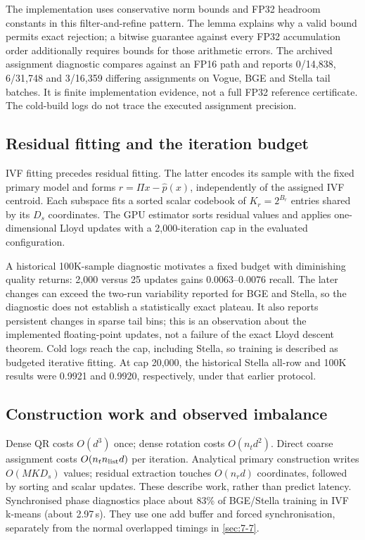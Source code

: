 The implementation uses conservative norm bounds and FP32 headroom
constants in this filter-and-refine pattern. The lemma explains why a
valid bound permits exact rejection; a bitwise guarantee against every
FP32 accumulation order additionally requires bounds for those arithmetic
errors. The archived assignment diagnostic compares against an FP16 path
and reports 0/14,838, 6/31,748 and 3/16,359 differing assignments on
Vogue, BGE and Stella tail batches. It is finite implementation evidence,
not a full FP32 reference certificate. The cold-build logs do not trace
the executed assignment precision.

\subsection{Residual fitting and the iteration budget}

IVF fitting precedes residual fitting. The latter encodes its sample
with the fixed primary model and forms $r=\Pi x-\widehat p(x)$, independently
of the assigned IVF centroid. Each subspace fits a sorted scalar codebook
of $K_r=2^{B_r}$ entries shared by its $D_s$ coordinates. The GPU
estimator sorts residual values and applies one-dimensional Lloyd updates
with a 2,000-iteration cap in the evaluated configuration.


A historical 100K-sample diagnostic motivates a fixed budget with diminishing quality
returns: 2,000 versus 25 updates gains $0.0063$--$0.0076$ recall.
The later changes can exceed the two-run variability reported for BGE
and Stella, so the diagnostic does not establish a statistically exact
plateau. It also reports persistent changes in sparse tail bins; this is
an observation about the implemented floating-point updates, not a
failure of the exact Lloyd descent theorem. Cold logs reach the cap,
including Stella, so training is described as budgeted iterative fitting.
At cap 20,000, the historical Stella all-row and 100K results were 0.9921
and 0.9920, respectively, under that earlier protocol.

\subsection{Construction work and observed imbalance}

Dense QR costs $O(d^3)$ once; dense rotation costs $O(n_t d^2)$.
Direct coarse assignment costs $O(n_t n_{\rm list}d)$ per iteration.
Analytical primary construction writes $O(MKD_s)$ values; residual
extraction touches $O(n_r d)$ coordinates, followed by sorting and scalar
updates. These describe work, rather than predict latency.
Synchronised phase diagnostics place about 83\% of BGE/Stella training
in IVF k-means (about 2.97\,s). They use one add buffer and forced
synchronisation, separately from the normal overlapped timings in
\cref{sec:7-7}.



